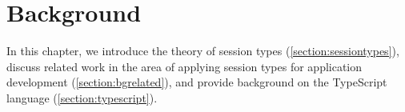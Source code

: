 \chapter{Background}
\label{chap:background}

In this chapter,
we introduce the theory
of session types
(\cref{section:sessiontypes}),
discuss related work
in the area of applying
session types for application development
(\cref{section:bgrelated}),
and provide background on the TypeScript language
(\cref{section:typescript}).






